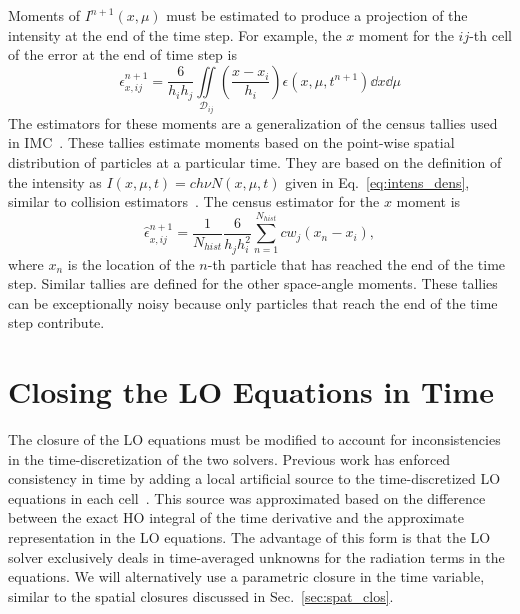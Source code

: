 Moments of $I^{n+1}(x,\mu)$ must be estimated to produce a projection of the intensity at
the end of the time step.
For example, the $x$ moment for the $ij$-th cell of the error at the end of time step is
\begin{equation}
    \epsilon^{n+1}_{x,ij} = \frac{6}{h_ih_j} \iint\limits_{\mathcal{D}_{ij}} \left(\frac{x
    - x_i}{h_i}\right) \epsilon(x,\mu,t^{n+1}) \dd x \dd \mu
\end{equation}
The estimators for these moments are a generalization of the census
tallies used in IMC~\cite{wollaber_review,wollaber_thesis}.  These tallies estimate
moments based on the point-wise spatial distribution of particles at a particular time.
They are based on the definition of the intensity as $I(x,\mu,t) = c h \nu N(x,\mu,t)$ given in
Eq.~\eqref{eq:intens_dens}, similar to collision estimators~\cite{shultis_mc,mcnp}.  The census estimator for the $x$ moment is
\begin{equation}
    \hat\epsilon^{n+1}_{x,ij} = \frac{1}{N_{hist}} \frac{6}{h_j h_i^2} \sum_{n=1}^{N_{hist}}
    c w_j  \left(x_{n} - x_{i}\right),
\end{equation}
where $x_n$ is the location of the $n$-th particle that has reached the end of the time step.
Similar tallies are defined for the other space-angle moments. These tallies can be
exceptionally noisy because only particles that reach the end of the time step contribute.


\section{Closing the LO Equations in Time}

The closure of the LO equations must be modified to account for inconsistencies in the
time-discretization of the two solvers. Previous work has enforced
consistency in time by adding a local artificial source to the time-discretized LO
equations in each cell~\cite{holo_rh}.  This
source was approximated based on the difference between the exact HO integral of the time
derivative and the approximate representation in the LO equations. The advantage
of this form is that the LO solver exclusively deals in
time-averaged unknowns for the radiation terms in the equations.  
We will alternatively use a
parametric closure in the time variable, similar to the spatial closures discussed in 
Sec.~\ref{sec:spat_clos}. 


